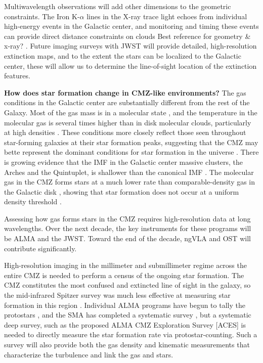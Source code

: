 \documentclass[modern]{aastex62}
\def\agnote#1{{\color{red}#1}}
\begin{document}
Multiwavelength observations will add other dimensions to the geometric constraints.
The Iron K-$\alpha$ lines in the X-ray trace light echoes from individual high-energy
events in the Galactic center, and monitoring and timing these events can
provide direct distance constraints on clouds \agnote{Best reference for
geometry \& x-ray?} \citep[e.g.][]{Terrier2018a}.  Future imaging surveys with JWST
will provide detailed, high-resolution extinction maps, and to the extent the stars
can be localized to the Galactic center, these will allow us to determine the line-of-sight
location of the extinction features.


\textbf{How does star formation change in CMZ-like environments?}
The gas conditions in the Galactic center are substantially different from the rest of the Galaxy.
Most of the gas mass is in a molecular state \citep[need to cite others][]{Mills2017a}, and the temperature in the molecular gas is several times
higher than in disk molecular clouds, particularly at high densities \citep{Ao2013a,Ginsburg2016a,Krieger2017a}.
These conditions more closely reflect those seen throughout star-forming galaxies at their star formation
peaks, suggesting that the CMZ may bette represent the dominant conditions for star formation in the universe
\citep{Kruijssen2013a}.
There is growing evidence that the IMF in the Galactic center massive clusters, the Arches and the Quintuplet,
is shallower than the canonical IMF \citep{Hosek2018a}.  The molecular gas in the CMZ forms stars at a much
lower rate than comparable-density gas in the Galactic disk \citep{Longmore2013b}, showing that star formation
does not occur at a uniform density threshold \citep{Walker2017a,Barnes2017b,Ginsburg2018a}.

Assessing how gas forms stars in the CMZ requires high-resolution data at long wavelengths.  Over the next
decade, the key instruments for these programs will be ALMA and the JWST.  Toward the end of the decade,
ngVLA and OST will contribute significantly.

High-resolution imaging in the millimeter and submillimeter regime across the entire CMZ is needed to perform
a census of the ongoing star formation.  The CMZ constitutes the most confused and extincted line of sight
in the galaxy, so the mid-infrared Spitzer survey was much less effective at measuring star formation in
this region \citep{Koepferl2014a}.  Individual ALMA programs have begun to
tally the protostars \citep[I'd like to cite others here, but it's all still in
prep, right?]{Ginsburg2018a}, and the SMA has completed a systematic survey
\citep{Battersby2016a}, but a systematic deep survey, such as the proposed ALMA CMZ Exploration Survey [ACES]
is needed to directly measure the star formation rate via protostar-counting.  Such a survey will also provide
both the gas density and kinematic measurements that characterize the turbulence and link the gas and stars.
\end{document}
